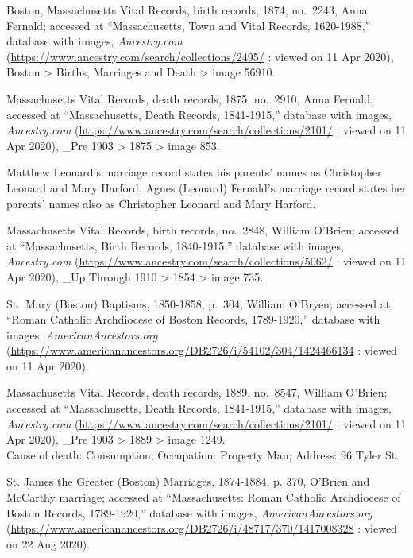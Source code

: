 \begin{thebibliography}{999}
Boston, Massachusetts Vital Records, birth records, 1874, no.\ 2243, Anna Fernald; accessed at ``Massachusetts, Town and Vital Records, 1620-1988,'' database with images, \textit{Ancestry.com} (\url{https://www.ancestry.com/search/collections/2495/} : viewed on 11 Apr 2020), Boston > Births, Marriages and Death > image 56910.

Massachusetts Vital Records, death records, 1875, no.\ 2910, Anna Fernald; accessed at ``Massachusetts, Death Records, 1841-1915,'' database with images, \textit{Ancestry.com} (\url{https://www.ancestry.com/search/collections/2101/} : viewed on 11 Apr 2020), \_Pre 1903 > 1875 > image 853.

Matthew Leonard's marriage record states his parents' names as Christopher Leonard and Mary Harford. Agnes (Leonard) Fernald's marriage record states her parents' names also as Christopher Leonard and Mary Harford.


Massachusetts Vital Records, birth records, no.\ 2848, William O'Brien; accessed at ``Massachusetts, Birth Records, 1840-1915,'' database with images, \textit{Ancestry.com} (\url{https://www.ancestry.com/search/collections/5062/} : viewed on 11 Apr 2020), \_Up Through 1910 > 1854 > image 735.

St.\ Mary (Boston) Baptisms, 1850-1858, p.\ 304, William O'Bryen; accessed at ``Roman Catholic Archdiocese of Boston Records, 1789-1920,'' database with images, \textit{AmericanAncestors.org} (\url{https://www.americanancestors.org/DB2726/i/54102/304/1424466134} : viewed on 11 Apr 2020).

Massachusetts Vital Records, death records, 1889, no.\ 8547, William O'Brien; accessed at ``Massachusetts, Death Records, 1841-1915,'' database with images, \textit{Ancestry.com} (\url{https://www.ancestry.com/search/collections/2101/} : viewed on 11 Apr 2020), \_Pre 1903 > 1889 > image 1249.\\
Cause of death: Consumption; Occupation: Property Man; Address: 96 Tyler St.

St. James the Greater (Boston) Marriages, 1874-1884, p. 370, O'Brien and McCarthy marriage; accessed at ``Massachusetts: Roman Catholic Archdiocese of Boston Records, 1789-1920,'' database with images, \textit{AmericanAncestors.org} (\url{https://www.americanancestors.org/DB2726/i/48717/370/1417008328} : viewed on 22 Aug 2020).


\end{thebibliography}
